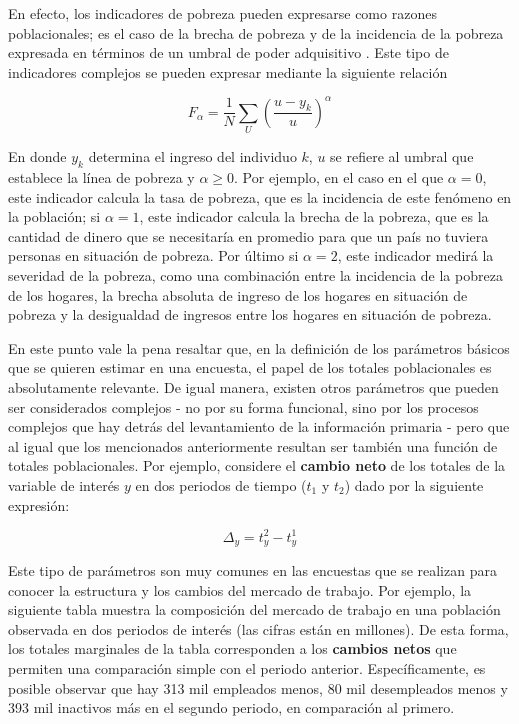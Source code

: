 \documentclass[
  10pt,
  spanish,
]{book}
\begin{document}
En efecto, los indicadores de pobreza pueden expresarse como razones poblacionales; es el caso de la brecha de pobreza y de la incidencia de la pobreza expresada en términos de un umbral de poder adquisitivo \citep{Foster_Greer_Thorbecke_1984}. Este tipo de indicadores complejos se pueden expresar mediante la siguiente relación

\[
F_{\alpha} = \frac{1}{N} \sum_U \left(\frac{u-y_k}{u}\right)^{\alpha}
\]

En donde \(y_k\) determina el ingreso del individuo \(k\), \(u\) se refiere al umbral que establece la línea de pobreza y \(\alpha \geq 0\). Por ejemplo, en el caso en el que \(\alpha = 0\), este indicador calcula la tasa de pobreza, que es la incidencia de este fenómeno en la población; si \(\alpha = 1\), este indicador calcula la brecha de la pobreza, que es la cantidad de dinero que se necesitaría en promedio para que un país no tuviera personas en situación de pobreza. Por último si \(\alpha = 2\), este indicador medirá la severidad de la pobreza, como una combinación entre la incidencia de la pobreza de los hogares, la brecha absoluta de ingreso de los hogares en situación de pobreza y la desigualdad de ingresos entre los hogares en situación de pobreza.

En este punto vale la pena resaltar que, en la definición de los parámetros básicos que se quieren estimar en una encuesta, el papel de los totales poblacionales es absolutamente relevante. De igual manera, existen otros parámetros que pueden ser considerados complejos - no por su forma funcional, sino por los procesos complejos que hay detrás del levantamiento de la información primaria - pero que al igual que los mencionados anteriormente resultan ser también una función de totales poblacionales. Por ejemplo, considere el \textbf{cambio neto} de los totales de la variable de interés \(y\) en dos periodos de tiempo (\(t_1\) y \(t_2\)) dado por la siguiente expresión:

\[
\Delta_y = t_{y}^2 - t_{y}^1
\]

Este tipo de parámetros son muy comunes en las encuestas que se realizan para conocer la estructura y los cambios del mercado de trabajo. Por ejemplo, la siguiente tabla muestra la composición del mercado de trabajo en una población observada en dos periodos de interés (las cifras están en millones). De esta forma, los totales marginales de la tabla corresponden a los \textbf{cambios netos} que permiten una comparación simple con el periodo anterior. Específicamente, es posible observar que hay 313 mil empleados menos, 80 mil desempleados menos y 393 mil inactivos más en el segundo periodo, en comparación al primero.
\end{document}
